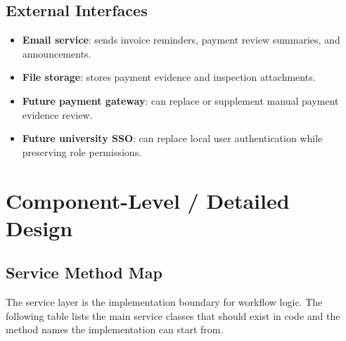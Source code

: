 \documentclass[11pt,a4paper]{article}
\begin{document}
\subsection{External Interfaces}
\begin{itemize}
  \item \textbf{Email service}: sends invoice reminders, payment review summaries, and announcements.
  \item \textbf{File storage}: stores payment evidence and inspection attachments.
  \item \textbf{Future payment gateway}: can replace or supplement manual payment evidence review.
  \item \textbf{Future university SSO}: can replace local user authentication while preserving role permissions.
\end{itemize}

\section{Component-Level / Detailed Design}

\subsection{Service Method Map}
The service layer is the implementation boundary for workflow logic. The following table lists the main service classes that should exist in code and the method names the implementation can start from.
\end{document}
